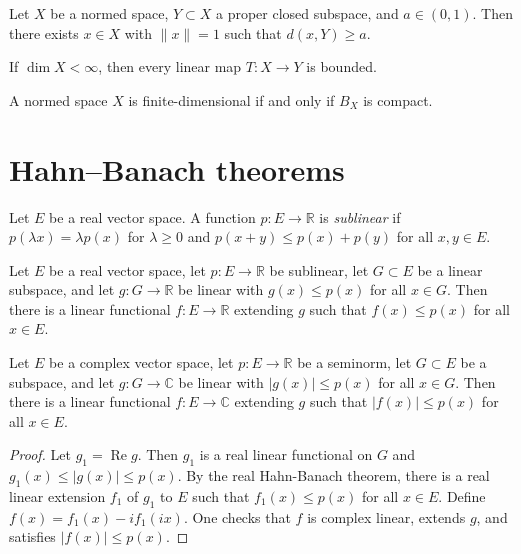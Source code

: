 \begin{lemma}[Riesz]
\label{lemma-riesz}
Let $X$ be a normed space, $Y \subset X$ a
proper closed subspace, and $a \in (0, 1)$.
Then there exists $x \in X$ with $\|x\|=1$
such that $d(x, Y) \geq a$.
\end{lemma}

\begin{theorem}
\label{%
theorem-finite-dimensional-operators-%
continuous}
If $\dim X < \infty$, then every linear map
$T : X \to Y$ is bounded.
\end{theorem}

\begin{theorem}
\label{theorem-unit-ball-compact-finite-dim}
A normed space $X$ is finite-dimensional if
and only if $B_X$ is compact.
\end{theorem}



\section{Hahn--Banach theorems}
\label{section-hahn-banach}

\begin{definition}
\label{definition-sublinear}
Let $E$ be a real vector space. A function
$p:E\to\mathbb{R}$ is {\it sublinear} if
$p(\lambda x)=\lambda p(x)$ for
$\lambda\geq0$ and $p(x+y)\leq p(x)+p(y)$ for
all $x,y \in E$.
\end{definition}

\begin{theorem}
\label{theorem-hahn-banach-real}
Let $E$ be a real vector space, let
$p:E\to\mathbb{R}$ be sublinear, let
$G\subset E$ be a linear subspace, and let
$g:G\to\mathbb{R}$ be linear with $g(x)\leq
p(x)$ for all $x\in G$. Then there is a
linear functional $f:E\to\mathbb{R}$
extending $g$ such that $f(x)\leq p(x)$ for
all $x\in E$.
\end{theorem}

\begin{theorem}
\label{theorem-hahn-banach-complex}
Let $E$ be a complex vector space, let
$p:E\to\mathbb{R}$ be a seminorm, let
$G\subset E$ be a subspace, and let
$g:G\to\mathbb{C}$ be linear with $|g(x)|\leq
p(x)$ for all $x\in G$. Then there is a
linear functional $f:E\to\mathbb{C}$
extending $g$ such that $|f(x)|\leq p(x)$ for
all $x\in E$.
\end{theorem}

\begin{proof}
Let $g_1 = \operatorname{Re} g$. Then $g_1$
is a real linear functional on $G$ and
$g_1(x) \leq |g(x)| \leq p(x)$. By the real
Hahn-Banach theorem, there is a real linear
extension $f_1$ of $g_1$ to $E$ such that
$f_1(x) \leq p(x)$ for all $x \in E$. Define
$f(x) = f_1(x) - i f_1(ix)$. One checks that
$f$ is complex linear, extends $g$, and
satisfies $|f(x)| \leq p(x)$.
\end{proof}

